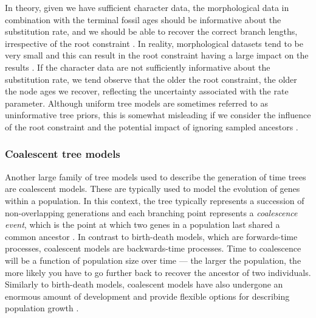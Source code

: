 In theory, given we have sufficient character data, the morphological data in combination with the terminal fossil ages should be informative about the substitution rate, and we should be able to recover the correct branch lengths, irrespective of the root constraint \citep{Ronquist2012a,Klopfstein2019}.
In reality, morphological datasets tend to be very small and this can result in the root constraint having a large impact on the results \citep{matzke2016}.
If the character data are not sufficiently informative about the substitution rate, we tend observe that the older the root constraint, the older the node ages we recover, reflecting the uncertainty associated with the rate parameter.
Although uniform tree models are sometimes referred to as uninformative tree priors, this is somewhat misleading if we consider the influence of the root constraint and the potential impact of ignoring sampled ancestors \citep{Gavryushkina2014}.

\subsubsection{Coalescent tree models}
Another large family of tree models used to describe the generation of time trees are coalescent models. These are typically used to model the evolution of genes within a population. 
In this context, the tree typically represents a succession of non-overlapping generations and each branching point represents a \textit{coalescence event}, which is the point at which two genes in a population last shared a common ancestor \citep{Kingman1982}.
In contrast to birth-death models, which are forwards-time processes, coalescent models are backwards-time processes.
Time to coalescence will be a function of population size over time --- the larger the population, the more likely you have to go further back to recover the ancestor of two individuals. %
Similarly to birth-death models, coalescent models have also undergone an enormous amount of development and provide flexible options for describing population growth \citep{Beerli2001, Drummond2005, Mashayekhi2019}. %

